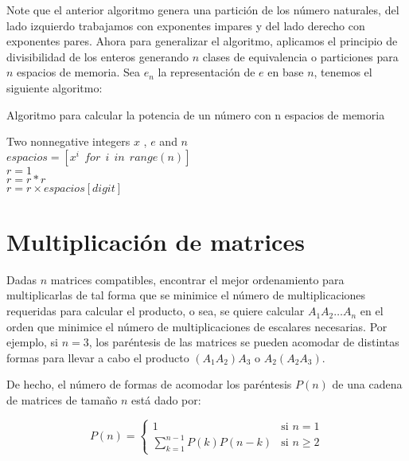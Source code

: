\documentclass{article}
\begin{document}
Note que el anterior algoritmo genera una partición de los número naturales, del lado izquierdo trabajamos con exponentes impares y del lado derecho con exponentes pares. Ahora para generalizar el algoritmo, aplicamos el principio de divisibilidad de los enteros generando $n$ clases de equivalencia o particiones para $n$ espacios de memoria.
Sea $e_n$ la representación de $e$ en base $n$, tenemos el siguiente algoritmo:
\begin{algorithm}
\caption{Algoritmo para calcular la potencia de un número con n espacios de memoria}\label{euclid}
  \begin{algorithmic}
    \Require Two nonnegative integers $x$ , $e$ and $n$\\
    $espacios = [x^i \ \ for\ \ i\ \ in\ \ range(n)]$\\
    $r = 1$
    \\
    \indent $r = r*r$
    \indent {} \\
    \indent \indent $r = r \times espacios[digit]$ 
    \indent \EndIf \\
    \EndFor
  \end{algorithmic}
\end{algorithm}

\section{Multiplicación de matrices}

Dadas $n$ matrices compatibles, encontrar el mejor ordenamiento para multiplicarlas de tal forma que se minimice el número de multiplicaciones requeridas para calcular el producto, o sea, se quiere calcular $A_1 A_2 \hdots A_n$ en el orden que minimice el número de multiplicaciones de escalares necesarias. Por ejemplo, si $n = 3$, los paréntesis de las matrices se pueden acomodar de distintas formas para llevar a cabo el producto $(A_1 A_2)A_3$ o $A_2(A_2 A_3)$.

De hecho, el número de formas de acomodar los paréntesis $P(n)$ de una cadena de matrices de tamaño $n$ está dado por:

\begin{equation*}
P(n) = \left\{
    \begin{array}{ll}
        1                          & \mbox{si } n = 1 \\
        \sum_{k=1}^{n-1}P(k)P(n-k) & \mbox{si } n \ge 2
    \end{array}
\right.
\end{equation*}
\end{document}
